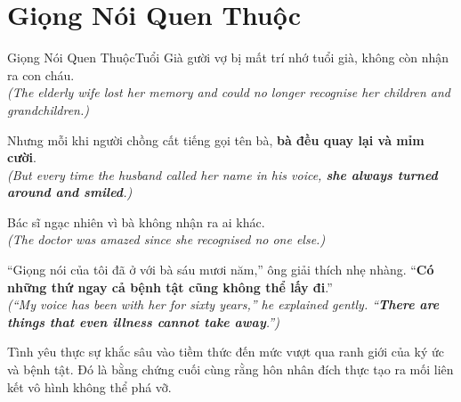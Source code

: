 \section{Giọng Nói Quen Thuộc}
\begin{truyen}{Giọng Nói Quen Thuộc}{Tuổi Già}
gười vợ bị mất trí nhớ tuổi già, không còn nhận ra con cháu.\\
\textit{(The elderly wife lost her memory and could no longer recognise her children and grandchildren.)}

Nhưng mỗi khi người chồng cất tiếng gọi tên bà, \textbf{bà đều quay lại và mỉm cười}.\\
\textit{(But every time the husband called her name in his voice, \textbf{she always turned around and smiled}.)}

Bác sĩ ngạc nhiên vì bà không nhận ra ai khác.\\
\textit{(The doctor was amazed since she recognised no one else.)}

``Giọng nói của tôi đã ở với bà sáu mươi năm,'' ông giải thích nhẹ nhàng. ``\textbf{Có những thứ ngay cả bệnh tật cũng không thể lấy đi}.''\\
\textit{(``My voice has been with her for sixty years,'' he explained gently. ``\textbf{There are things that even illness cannot take away}.'')}
\end{truyen}
\begin{baihoc}
  Tình yêu thực sự khắc sâu vào tiềm thức đến mức vượt qua ranh giới của ký ức và bệnh tật. Đó là bằng chứng cuối cùng rằng hôn nhân đích thực tạo ra mối liên kết vô hình không thể phá vỡ.
\end{baihoc}
